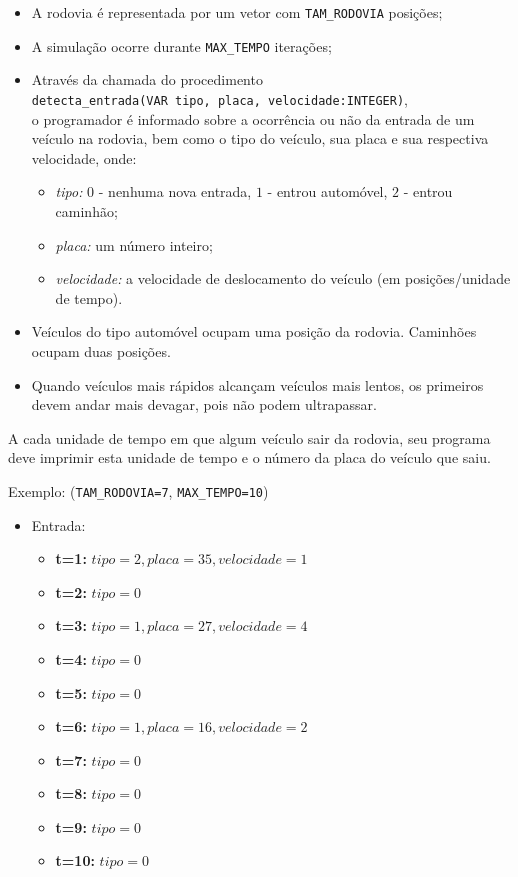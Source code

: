 \begin{enumerate}
\begin{itemize}
    \item A rodovia é representada por um vetor com \verb|TAM_RODOVIA| posições;
    \item A simulação ocorre durante \verb|MAX_TEMPO| iterações;
    \item Através da chamada do procedimento \\
          \verb|detecta_entrada(VAR tipo, placa, velocidade:INTEGER)|,\\
          o programador é 
          informado sobre a ocorrência ou não da entrada de um veículo na
          rodovia, bem como o tipo do veículo, sua placa e sua respectiva 
          velocidade, onde:
        \begin{itemize}
            \item \emph{tipo:} $0$ - nenhuma nova entrada, 
                               $1$ - entrou automóvel, 
                               $2$ - entrou caminhão;
            \item \emph{placa:} um número inteiro;
            \item \emph{velocidade:} a velocidade de deslocamento do veículo 
                   (em posições/unidade de tempo).
        \end{itemize}
    \item Veículos do tipo automóvel ocupam uma posição da rodovia. 
          Caminhões ocupam duas posições.
    \item Quando veículos mais rápidos alcançam veículos mais lentos, os 
          primeiros devem andar mais devagar, pois não podem ultrapassar.
\end{itemize}    
    

A cada unidade de tempo em que algum veículo sair da rodovia, seu programa
deve imprimir esta unidade de tempo e o número da placa do veículo que saiu.

Exemplo: (\verb|TAM_RODOVIA=7|, \verb|MAX_TEMPO=10|)
\begin{itemize}
    \item Entrada:
    \begin{itemize}
        \item \textbf{t=1:} $tipo=2, placa=35, velocidade=1$
        \item \textbf{t=2:} $tipo=0$
        \item \textbf{t=3:} $tipo=1, placa=27, velocidade=4$
        \item \textbf{t=4:} $tipo=0$
        \item \textbf{t=5:} $tipo=0$
        \item \textbf{t=6:} $tipo=1, placa=16, velocidade=2$
        \item \textbf{t=7:} $tipo=0$
        \item \textbf{t=8:} $tipo=0$
        \item \textbf{t=9:} $tipo=0$
        \item \textbf{t=10:} $tipo=0$
    \end{itemize}


\end{itemize}
\end{enumerate}
